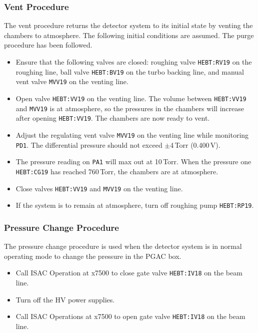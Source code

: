 \subsubsection{Vent Procedure}
The vent procedure returns the detector system to its initial state by venting the chambers to atmosphere. The following initial conditions are assumed. The purge procedure has been followed. 
\begin{itemize}
\setlength{\itemsep}{0pt}
\setlength{\parskip}{0pt}
\item Ensure that the following valves are closed: roughing valve \texttt{HEBT:RV19} on the roughing line, ball valve \texttt{HEBT:BV19} on the turbo backing line, and manual vent valve \texttt{MVV19} on the venting line.
\item Open valve \texttt{HEBT:VV19} on the venting line. The volume between \texttt{HEBT:VV19} and \texttt{MVV19} is at atmosphere, so the pressures in the chambers will increase after opening \texttt{HEBT:VV19}. The chambers are now ready to vent.
\item Adjust the regulating vent valve \texttt{MVV19} on the venting line while monitoring \texttt{PD1}.  The differential pressure should not exceed $\pm$4\,Torr (0.400\,V).
\item The pressure reading on \texttt{PA1} will max out at 10\,Torr. When the pressure one \texttt{HEBT:CG19} has reached 760\,Torr, the chambers are at atmosphere.
\item Close valves \texttt{HEBT:VV19} and \texttt{MVV19} on the venting line.
\item If the system is to remain at atmosphere, turn off roughing pump \texttt{HEBT:RP19}.
\end{itemize}

\subsubsection{Pressure Change Procedure}
The pressure change procedure is used when the detector system is in normal operating mode to change the pressure in the PGAC box.
\begin{itemize}
\setlength{\itemsep}{0pt}
\setlength{\parskip}{0pt}
\item Call ISAC Operation at x7500 to close gate valve \texttt{HEBT:IV18} on the beam line.
\item Turn off the HV power supplies.
\pidset
\hvon
\item Call ISAC Operations at x7500 to open gate valve \texttt{HEBT:IV18} on the beam line.
\end{itemize}
